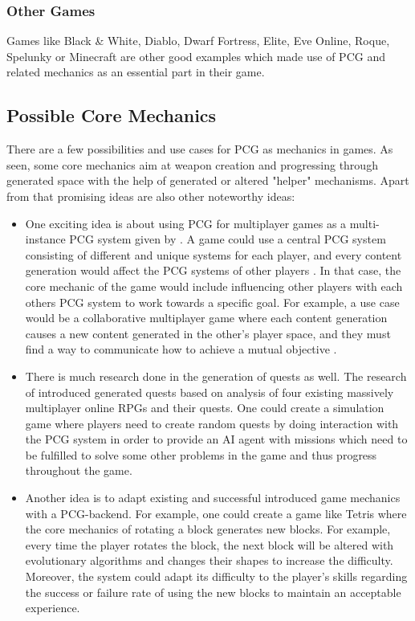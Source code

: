 \documentclass[MGS,Master,english]{twbook}%
\begin{document}
\subsubsection{Other Games}
Games like Black \& White, Diablo, Dwarf Fortress, Elite, Eve Online, Roque, Spelunky or Minecraft are other good examples which made use of \ac{PCG} and related mechanics as an essential part in their game.

\subsection{Possible Core Mechanics}
There are a few possibilities and use cases for \ac{PCG} as mechanics in games. As seen, some core mechanics aim at weapon creation and progressing through generated space with the help of generated or altered "helper" mechanisms. Apart from that promising ideas are also other noteworthy ideas:
\begin{itemize}
	\item One exciting idea is about using \ac{PCG} for multiplayer games as a multi-instance \ac{PCG} system given by \citep{pcg::futureOfPcgInGames}. A game could use a central \ac{PCG} system consisting of different and unique systems for each player, and every content generation would affect the \ac{PCG} systems of other players \cite{pcg::futureOfPcgInGames}.  In that case, the core mechanic of the game would include influencing other players with each others \ac{PCG} system to work towards a specific goal. For example, a use case would be a collaborative multiplayer game where each content generation causes a new content generated in the other’s player space, and they must find a way to communicate how to achieve a mutual objective \cite{pcg::futureOfPcgInGames}. 
	\item There is much research done in the generation of quests as well. The research of \citep{pcg::questGenerator} introduced generated quests based on analysis of four existing massively multiplayer online \acp{RPG} and their quests. One could create a simulation game where players need to create random quests by doing interaction with the \ac{PCG} system in order to provide an \ac{AI} agent with missions which need to be fulfilled to solve some other problems in the game and thus progress throughout the game.
	\item Another idea is to adapt existing and successful introduced game mechanics with a \ac{PCG}-backend. For example, one could create a game like Tetris where the core mechanics of rotating a block generates new blocks. For example, every time the player rotates the block, the next block will be altered with evolutionary algorithms and changes their shapes to increase the difficulty. Moreover, the system could adapt its difficulty to the player's skills regarding the success or failure rate of using the new blocks to maintain an acceptable experience.
\end{itemize} 
\end{document}
